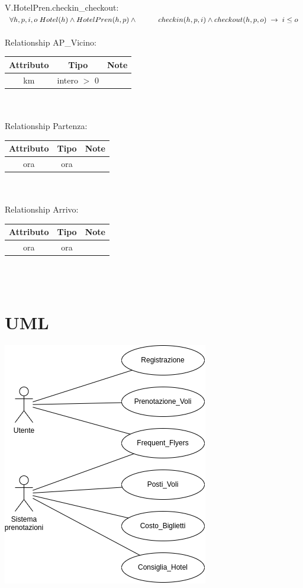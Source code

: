 \documentclass[a4paper,12pt]{report}
\begin{document}
      V.HotelPren.checkin\_checkout: $\forall h, p, i, o \; Hotel(h) \wedge HotelPren(h, p) \wedge \\
      \hspace*{1cm}checkin(h, p, i) \wedge checkout(h, p, o) \;\rightarrow\; i \leq o $ \\ \\
      Relationship AP\_Vicino: \\
      \begin{tabular}{|c|c|c|}
        \hline Attributo & Tipo & Note \\
        \hline km & intero $>$ 0 & \\
        \hline
      \end{tabular} \\ \\
      Relationship Partenza: \\
      \begin{tabular}{|c|c|c|}
        \hline Attributo & Tipo & Note \\
        \hline ora & ora & \\
        \hline
      \end{tabular} \\ \\
      Relationship Arrivo: \\
      \begin{tabular}{|c|c|c|}
        \hline Attributo & Tipo & Note \\
        \hline ora & ora & \\
        \hline
      \end{tabular} \\ \\

    \chapter{UML}
      \begin{center}
        \includegraphics{uml.png}
      \end{center}
\end{document}
